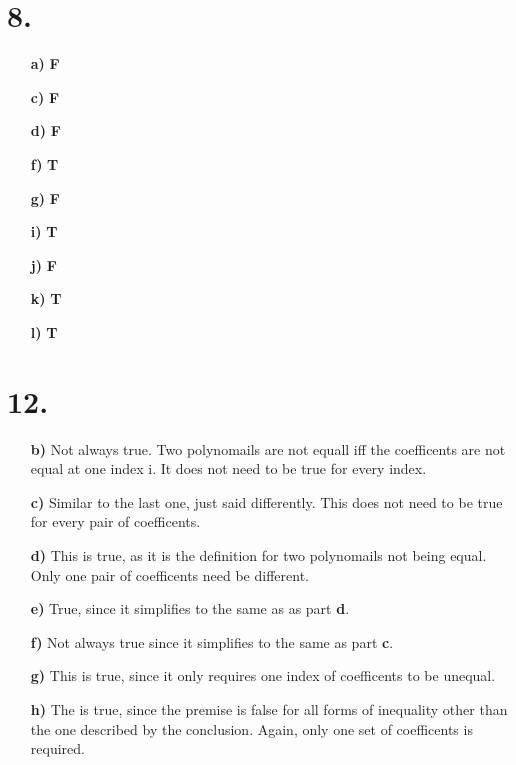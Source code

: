 \documentclass[12pt,letterpaper]{article}
\begin{document}
\section*{8.}
\begin{enumerate}[label= \textbf{\alph*)}]
	\item[\textbf{a)}] \textbf{F}
	\item[\textbf{c)}] \textbf{F}
	\item[\textbf{d)}] \textbf{F}
	\item[\textbf{f)}] \textbf{T}
	\item[\textbf{g)}] \textbf{F}
	\item[\textbf{i)}] \textbf{T}
	\item[\textbf{j)}] \textbf{F}
	\item[\textbf{k)}] \textbf{T}
	\item[\textbf{l)}] \textbf{T}
\end{enumerate}

\section*{12.}
\begin{enumerate}[label= \textbf{\alph*)}]
	\item[\textbf{b)}] Not always true. Two polynomails are not equall iff 
						the coefficents are not equal at one index i. It does
						not need to be true for every index. 
	\item[\textbf{c)}] Similar to the last one, just said differently. This does not
						need to be true for every pair of coefficents. 
	\item[\textbf{d)}] This is true, as it is the definition for two polynomails
						not being equal. Only one pair of coefficents need be different. 
	\item[\textbf{e)}] True, since it simplifies to the same as as part \textbf{d}.
	\item[\textbf{f)}] Not always true since it simplifies to the same as part \textbf{c}.
	\item[\textbf{g)}] This is true, since it only requires one index of coefficents to be unequal.
	\item[\textbf{h)}] The is true, since the premise is false for all forms of inequality
						other than the one described by the conclusion. Again, only one
						set of coefficents is required.
\end{enumerate}
\end{document}
